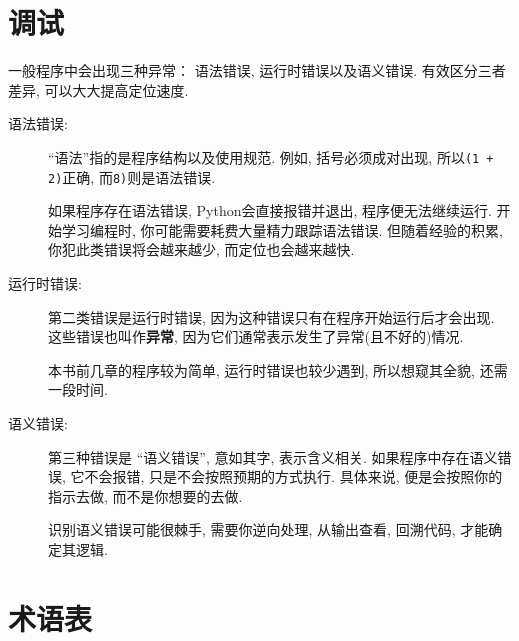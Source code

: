 \documentclass[10pt]{book}
\begin{document}
\section{调试}

一般程序中会出现三种异常：
语法错误, 运行时错误以及语义错误. 
有效区分三者差异, 可以大大提高定位速度. 

\begin{description}

\item[语法错误:] ``语法''指的是程序结构以及使用规范. 
例如, 括号必须成对出现, 
所以{\tt (1 + 2)}正确, 而{\tt 8)}则是语法错误. 

如果程序存在语法错误, Python会直接报错并退出, 
程序便无法继续运行. 
开始学习编程时, 你可能需要耗费大量精力跟踪语法错误. 
但随着经验的积累, 你犯此类错误将会越来越少, 而定位也会越来越快.


\item[运行时错误:] 第二类错误是运行时错误, 
因为这种错误只有在程序开始运行后才会出现. 
这些错误也叫作{\bf 异常}, 
因为它们通常表示发生了异常(且不好的)情况. 
 
    

本书前几章的程序较为简单, 运行时错误也较少遇到, 
所以想窥其全貌, 还需一段时间. 

\item[语义错误:] 第三种错误是 ``语义错误'', 
意如其字, 表示含义相关. 
如果程序中存在语义错误, 它不会报错, 只是不会按照预期的方式执行. 
具体来说, 便是会按照你的指示去做, 而不是你想要的去做.
   

识别语义错误可能很棘手, 需要你逆向处理, 
从输出查看, 回溯代码, 才能确定其逻辑. 

\end{description}


\section{术语表}
\end{document}
